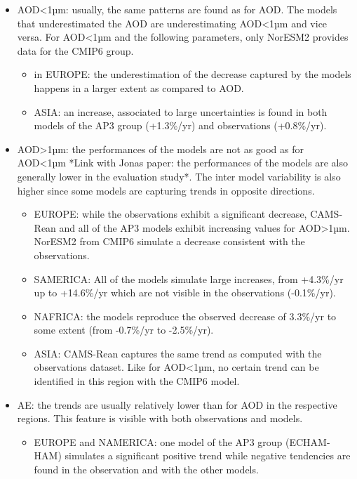 \documentclass[journal abbreviation, manuscript]{copernicus}
\begin{document}
\begin{itemize}
\begin{itemize}
       \end{itemize}
 \item AOD<1µm: usually, the same patterns are found as for AOD. The models that underestimated the AOD are underestimating AOD<1µm and vice versa. For AOD<1µm and the following parameters, only NorESM2 provides data for the CMIP6 group.
       \begin{itemize}
        \item in EUROPE: the underestimation of the decrease captured by the models happens in a larger extent as compared to AOD.
        \item ASIA: an increase, associated to large uncertainties is found in both models of the AP3 group (+1.3\%/yr) and observations (+0.8\%/yr).
       \end{itemize}
 \item AOD>1µm: the performances of the models are not as good as for AOD<1µm *Link with Jonas paper: the performances of the models are also generally lower in the evaluation study*. The inter model variability is also higher since some models are capturing trends in opposite directions.
       \begin{itemize}
        \item EUROPE: while the observations exhibit a significant decrease, CAMS-Rean and all of the AP3 models exhibit increasing values for AOD>1µm. NorESM2 from CMIP6 simulate a decrease consistent with the observations.
        \item SAMERICA: All of the models simulate large increases, from +4.3\%/yr up to +14.6\%/yr  which are not visible in the observations (-0.1\%/yr).
        \item NAFRICA: the models reproduce the observed decrease of 3.3\%/yr to some extent (from -0.7\%/yr to -2.5\%/yr).
        \item ASIA: CAMS-Rean captures the same trend as computed with the observations dataset. Like for AOD<1µm, no certain trend can be identified  in this region with the CMIP6 model.
       \end{itemize}
 \item AE: the trends are usually relatively lower than for AOD in the respective regions. This feature is visible with both observations and models.
       \begin{itemize}
        \item EUROPE and NAMERICA: one model of the AP3 group (ECHAM-HAM) simulates a significant positive trend while negative tendencies are found in the observation and with the other models.

\end{itemize}
\end{itemize}
\end{document}
